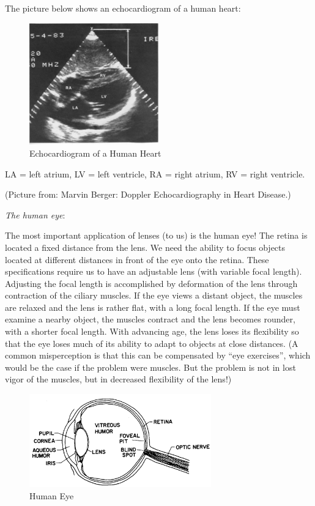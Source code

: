 The picture below shows an echocardiogram of a human heart:
\begin{figure}[h]
    \begin{center}
        \includegraphics[width=0.5\textwidth]{./Exp6/pic/image021.png}
    \end{center}
    \caption{Echocardiogram of a Human Heart}
    \label{fig:heartgram}
\end{figure}

LA = left atrium, LV = left ventricle, RA = right atrium, RV = right ventricle.\myskip

(Picture from: Marvin Berger: Doppler Echocardiography in Heart Disease.)\myskip

\noindent\emph{The human eye}:\vspace{0.6\baselineskip}

The most important application of lenses (to us) is the human eye! The retina is located a fixed distance from the lens. We need the ability to focus objects located at different distances in front of the eye onto the retina. These specifications require us to have an adjustable lens (with variable focal length). Adjusting the focal length is accomplished by deformation of the lens through contraction of the ciliary muscles. If the eye views a distant object, the muscles are relaxed and the lens is rather flat, with a long focal length. If the eye must examine a nearby object, the muscles contract and the lens becomes rounder, with a shorter focal length. With advancing age, the lens loses its flexibility so that the eye loses much of its ability to adapt to objects at close distances. (A common misperception is that this can be compensated by ``eye exercises'', which would be the case if the problem were muscles. But the problem is not in lost vigor of the muscles, but in decreased flexibility of the lens!)\myskip

\begin{figure}[!h]
\centering
\includegraphics[width=0.7\textwidth]{./Exp6/pic/image11.png}
\caption{Human Eye}
\end{figure}


